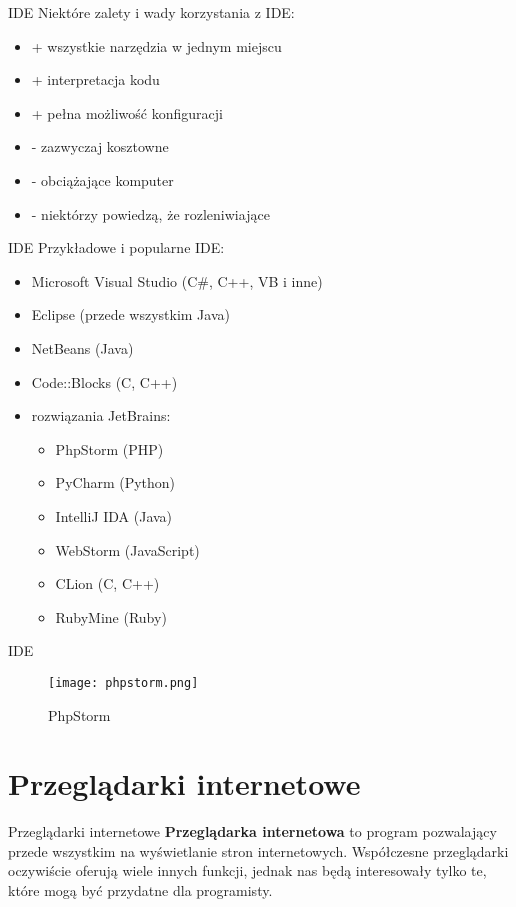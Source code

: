 \begin{frame}{IDE}
	Niektóre zalety i wady korzystania z IDE:
	\begin{itemize}
		\item + wszystkie narzędzia w jednym miejscu
		\item + interpretacja kodu
		\item + pełna możliwość konfiguracji
		\item - zazwyczaj kosztowne
		\item - obciążające komputer
		\item - niektórzy powiedzą, że rozleniwiające
	\end{itemize}
\end{frame}

\begin{frame}{IDE}
	Przykładowe i popularne IDE:
	\begin{itemize}
		\item Microsoft Visual Studio (C\#, C++, VB i inne)
		\item Eclipse (przede wszystkim Java)
		\item NetBeans (Java)
		\item Code::Blocks (C, C++)
		\item rozwiązania JetBrains:
		
		\begin{itemize}
			\item PhpStorm (PHP)
			\item PyCharm (Python)
			\item IntelliJ IDA (Java)
			\item WebStorm (JavaScript)
			\item CLion (C, C++)
			\item RubyMine (Ruby)
		\end{itemize}
	\end{itemize}
\end{frame}

\begin{frame}{IDE}
	\begin{figure}[t]
		\centering
		\texttt{[image: phpstorm.png]}
		\caption{PhpStorm}
	\end{figure}
\end{frame}

\section{Przeglądarki internetowe}

\begin{frame}{Przeglądarki internetowe}
	\textbf{Przeglądarka internetowa} to program pozwalający przede wszystkim na wyświetlanie stron internetowych. Współczesne przeglądarki oczywiście oferują wiele innych funkcji, jednak nas będą interesowały tylko te, które mogą być przydatne dla programisty.
\end{frame}

